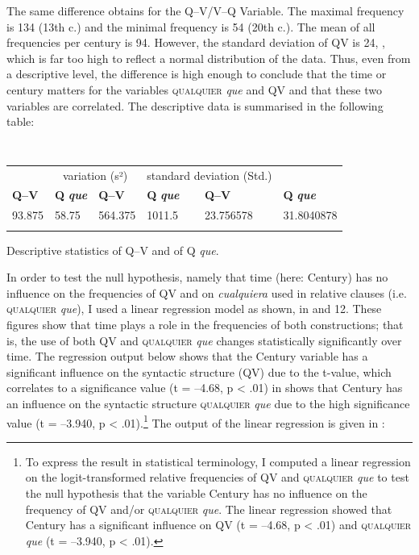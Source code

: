   The same difference obtains for the Q–V/V–Q Variable. The maximal frequency is 134 (13th c.) and the minimal frequency is 54 (20th c.). The mean of all frequencies per century is 94. However, the standard deviation of QV is 24, , which is far too high to reflect a normal distribution of the data. Thus, even from a descriptive level, the difference is high enough to conclude that the time or century matters for the variables \textsc{qualquier} \textit{que} and QV and that these two variables are correlated. The descriptive data is summarised in the following table:


\begin{table}
\begin{tabularx}{\textwidth}{XXXXXX}
\lsptoprule
\multicolumn{2}{c}{ mean} & \multicolumn{2}{c}{ variation (s²)} & \multicolumn{2}{c}{ standard deviation (Std.)}\\
 \textbf{Q–V} & \textbf{Q} \textbf{\textit{que}} & \textbf{Q–V} & \textbf{Q} \textbf{\textit{que}} & \textbf{Q–V} & \textbf{Q} \textbf{\textit{que}}\\
 93.875 & 58.75 & 564.375 & 1011.5 & 23.756578 & 31.8040878\\
\lspbottomrule
\end{tabularx}
\caption{\label{tab:} ~}Descriptive statistics of Q–V and of Q \textit{que}.
\end{table}

In order to test the null hypothesis, namely that time (here: Century) has no influence on the frequencies of QV and on \textit{cualquiera} used in relative clauses (i.e. \textsc{qualquier} \textit{que}), I used a linear regression model as shown, in  and 12. These figures show that time plays a role in the frequencies of both constructions; that is, the use of both QV and \textsc{qualquier} \textit{que} changes statistically significantly over time. The regression output below shows that the Century variable has a significant influence on the syntactic structure (QV) due to the t-value, which correlates to a significance value (t = –4.68, p < .01) in  shows that Century has an influence on the syntactic structure \textsc{qualquier} \textit{que} due to the high significance value (t = –3.940, p < .01).\footnote{{To express the result in statistical terminology, I computed a linear regression on the logit-transformed relative frequencies of QV and} \textsc{qualquier}{ \textit{que}} {to test the null hypothesis that the variable Century has no influence on the frequency of QV and/or} \textsc{qualquier} {\textit{que}}{. The linear regression showed that Century has a significant influence on QV (t = –4.68, p < .01) and} \textsc{qualquier} {\textit{que}} {(t = –3.940, p < .01).}} The output of the linear regression is given in :


